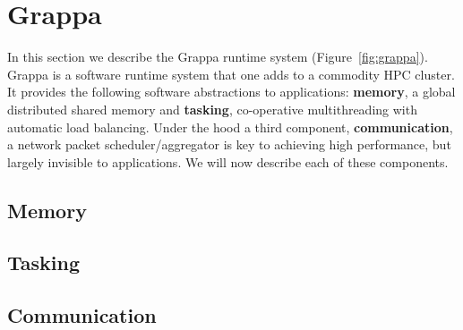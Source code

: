 \section{Grappa} \label{sec:grappa}

In this section we describe the Grappa runtime system (Figure~\ref{fig:grappa}).  Grappa is a software runtime system that one adds to a commodity HPC cluster.  It provides the following software abstractions to applications: \textbf{memory}, a global distributed shared memory and \textbf{tasking}, co-operative multithreading with automatic load balancing.  Under the hood a third component, \textbf{communication}, a network packet scheduler/aggregator is key to achieving high performance, but largely invisible to applications.  We will now describe each of these components.

\subsection{Memory}

\subsection{Tasking}

\subsection{Communication}
